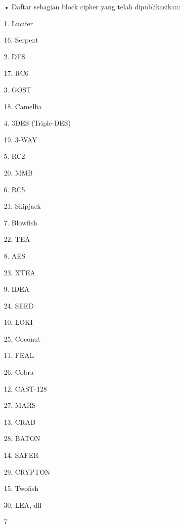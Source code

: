 \documentclass{article}
\begin{document}

• Daftar sebagian block cipher yang telah dipublikasikan:

 1. Lucifer 




16. Serpent

    2. DES  




17. RC6 

    3. GOST 




18. Camellia

    4.  3DES (Triple-DES) 



19. 3-WAY

 5. RC2  




20. MMB

 6. RC5  




21. Skipjack

     7. Blowfish 




22. TEA

 8. AES 




23. XTEA

 9. IDEA 




24. SEED

 10. LOKI 




25. Coconut

 11. FEAL 




26. Cobra 

 12. CAST-128  



27. MARS

 13. CRAB 




28. BATON 

 14. SAFER 




29. CRYPTON

 15. Twofish 




30. LEA, dll

7
\end{document}
